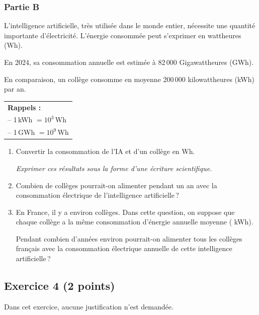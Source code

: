 \documentclass[11pt]{article}
\begin{document}
\bigskip

\subsubsection*{Partie B}

L'intelligence artificielle, très utilisée dans le monde entier, nécessite une quantité importante d'électricité. L'énergie consommée peut s'exprimer en wattheures (Wh).

En 2024, sa consommation annuelle est estimée à 82\,000 Gigawattheures (GWh).

En comparaison, un collège consomme en moyenne 200\,000 kilowattheures (kWh) par an.

\medskip

\begin{center}
\begin{tabularx}{0.35\linewidth}{|X|}\hline
\textbf{Rappels :}\\
-- 1\,kWh $= 10^3$\,Wh\\
-- 1\,GWh $= 10^9$\,Wh\\ \hline
\end{tabularx}
\end{center}

\medskip

\begin{enumerate}[resume]
\item Convertir la consommation de l'IA et d'un collège en Wh.

\emph{Exprimer ces résultats sous la forme d'une écriture scientifique.}
\item Combien de collèges pourrait-on alimenter pendant un an avec la consommation électrique de l'intelligence artificielle\,?
\item En France, il y a environ  collèges. Dans cette question, on suppose que chaque collège a la même consommation d'énergie annuelle moyenne ( kWh).

Pendant combien d'années environ pourrait-on alimenter tous les collèges français avec la consommation électrique annuelle de cette intelligence artificielle\,?
\end{enumerate}


\subsection*{Exercice 4 \normalfont(2 points)}

Dans cet exercice, aucune justification n'est demandée.
\end{document}
